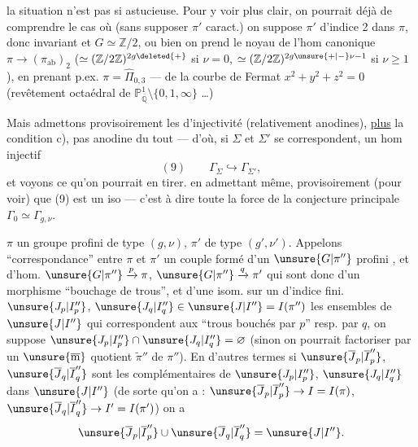 la situation n'est  pas si astucieuse.
Pour y voir plus clair, on pourrait déjà
 de comprendre le cas où (sans
supposer $\pi'$ caract.) on suppose $\pi'$ d'indice
2 dans $\pi$, donc invariant et $G\simeq\mathbb Z/2$, ou
bien on prend  le noyau de l'hom
canonique $\pi\longrightarrow(\pi_{\mathrm{ab}})_2$ ($\simeq(\mathbb Z/2\mathbb Z)^{2g\deleted{+}}$ si $\nu=0$,
$\simeq(\mathbb Z/2\mathbb Z)^{2g\unsure{+|-}\nu-1}$ si $\nu\geq1$), en prenant p.ex.
$\pi=\widehat\Pi_{0,3}$ ---  de la courbe de
Fermat $x^2+y^2+z^2=0$ (revêtement octaédral
de $\mathbb P^1_{\overline{\mathbb Q}}\setminus\{0,1,\infty\}$ \dots)

Mais admettons provisoirement les 
d'injectivité (relativement anodines), \uline{plus} la
condition c), pas anodine du tout ---
d'où, si $\Sigma$ et $\Sigma'$ se correspondent, un hom
injectif
\[
(9)\qquad \Gamma_{\Sigma}\hookrightarrow\Gamma_{\Sigma'},
\]
et voyons ce qu'on pourrait en tirer.
en admettant même, provisoirement (pour
voir) que (9) est un iso --- 
c'est à dire toute la force de la conjecture
principale $\Gamma_0\simeq\Gamma_{g,\nu}$.


 $\pi$ un groupe profini  de type $(g,\nu)$, $\pi'$ de type $(g',\nu')$. Appelons ``correspondance'' entre $\pi$ et $\pi'$ un  couple formé d'un $\unsure{G|\pi''}$ profini  , et d'hom.  $\unsure{G|\pi''}\xrightarrow{p}\pi$, $\unsure{G|\pi''}\xrightarrow{q}\pi'$ qui sont donc   d'un morphisme ``bouchage de trous'', et d'une  isom. sur un  d'indice fini.
 $\unsure{J_p|I''_p}$, $\unsure{J_q|I''_q}\in\unsure{J|I''}=I(\pi'')$ les ensembles de $\unsure{J|I''}$ qui correspondent aux ``trous bouchés par $p$'' resp. par $q$, on suppose  $\unsure{J_p|I''_p}\cap\unsure{J_q|I''_q}=\varnothing$ (sinon on pourrait factoriser par un $\unsure{\overline{\mathrm m}}$ quotient $\widetilde{\pi}''$ de $\pi''$). En d'autres termes si $\unsure{\overline{J}_p|\overline{I}''_p}$, $\unsure{\overline{J}_q|\overline{I}''_q}$ sont les complémentaires de $\unsure{J_p|I''_p}$, $\unsure{J_q|I''_q}$ dans $\unsure{J|I''}$ (de sorte qu'on a : $\unsure{\overline{J}_p|\overline{I}''_p}\to I=I(\pi)$, $\unsure{\overline{J}_q|\overline{I}''_q}\to I'=I(\pi')$) on a
\[
\unsure{\overline{J}_p|\overline{I}''_p}\cup\unsure{\overline{J}_q|\overline{I}''_q}=\unsure{J|I''}.
\]

